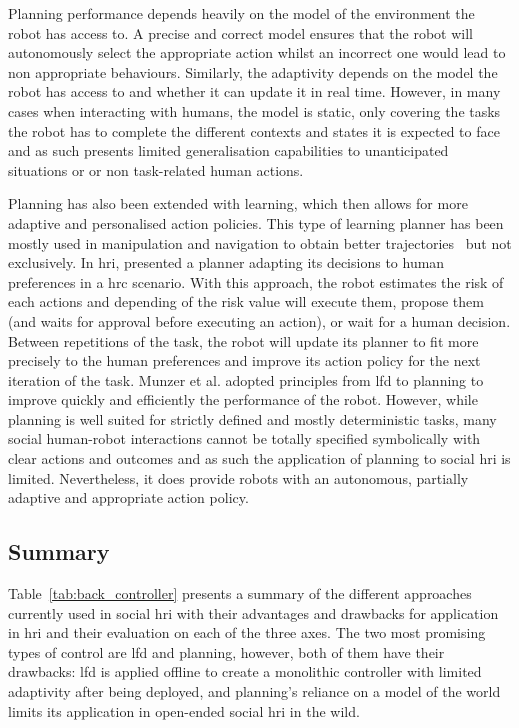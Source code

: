     Planning performance depends heavily on the model of the environment the robot has access to. A precise and correct model ensures that the robot will autonomously select the appropriate action whilst an incorrect one would lead to non appropriate behaviours. Similarly, the adaptivity depends on the model the robot has access to and whether it can update it in real time. However, in many cases when interacting with humans, the model is static, only covering the tasks the robot has to complete the different contexts and states it is expected to face and as such presents limited generalisation capabilities to unanticipated situations or or non task-related human actions.
    
    Planning has also been extended with learning, which then allows for more adaptive and personalised action policies. This type of learning planner has been mostly used in manipulation and navigation to obtain better trajectories~\citep{jain2013learning,beetz2004rpllearn} but not exclusively. In \gls{hri}, \cite{munzer2017efficient} presented a planner adapting its decisions to human preferences in a \gls{hrc} scenario. With this approach, the robot estimates the risk of each actions and depending of the risk value will execute them, propose them (and waits for approval before executing an action), or wait for a human decision. Between repetitions of the task, the robot will update its planner to fit more precisely to the human preferences and improve its action policy for the next iteration of the task. Munzer et al. adopted principles from \gls{lfd} to planning to improve quickly and efficiently the performance of the robot. However, while planning is well suited for strictly defined and mostly deterministic tasks, many social human-robot interactions cannot be totally specified symbolically with clear actions and outcomes and as such the application of planning to social \gls{hri} is limited. Nevertheless, it does provide robots with an autonomous, partially adaptive and appropriate action policy.
		
\subsection{Summary}

	Table~\ref{tab:back_controller} presents a summary of the different approaches currently used in social \gls{hri} with their advantages and drawbacks for application in \gls{hri} and their evaluation on each of the three axes. The two most promising types of control are \gls{lfd} and planning, however, both of them have their drawbacks: \gls{lfd} is applied offline to create a monolithic controller with limited adaptivity after being deployed, and planning's reliance on a model of the world limits its application in open-ended social \gls{hri} in the wild.
	
